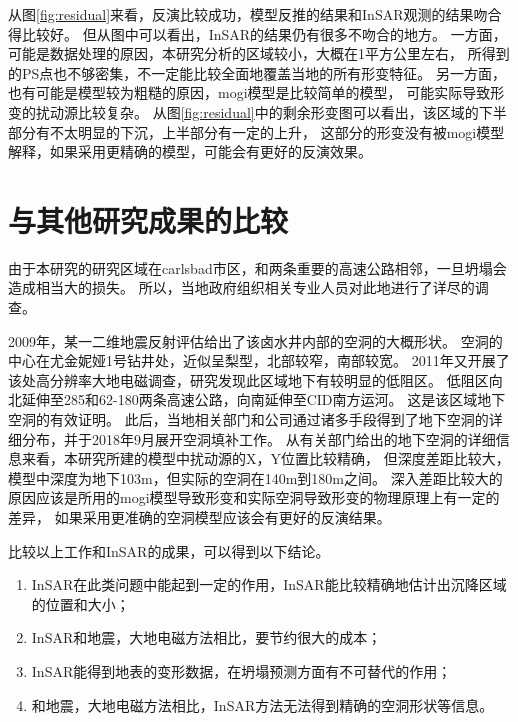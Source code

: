 从图\ref{fig:residual}来看，反演比较成功，模型反推的结果和InSAR观测的结果吻合得比较好。
但从图中可以看出，InSAR的结果仍有很多不吻合的地方。
一方面，可能是数据处理的原因，本研究分析的区域较小，大概在1平方公里左右，
所得到的PS点也不够密集，不一定能比较全面地覆盖当地的所有形变特征。
另一方面，也有可能是模型较为粗糙的原因，mogi模型是比较简单的模型，
可能实际导致形变的扰动源比较复杂。
从图\ref{fig:residual}中的剩余形变图可以看出，该区域的下半部分有不太明显的下沉，上半部分有一定的上升，
这部分的形变没有被mogi模型解释，如果采用更精确的模型，可能会有更好的反演效果。

\section{与其他研究成果的比较}
由于本研究的研究区域在carlsbad市区，和两条重要的高速公路相邻，一旦坍塌会造成相当大的损失。
所以，当地政府组织相关专业人员对此地进行了详尽的调查。

2009年，某一二维地震反射评估给出了该卤水井内部的空洞的大概形状。
空洞的中心在尤金妮娅1号钻井处，近似呈梨型，北部较窄，南部较宽。
2011年又开展了该处高分辨率大地电磁调查\cite{landElectricalResistivitySurvey2011}，研究发现此区域地下有较明显的低阻区。
低阻区向北延伸至285和62-180两条高速公路，向南延伸至CID南方运河。
这是该区域地下空洞的有效证明。
此后，当地相关部门和公司通过诸多手段得到了地下空洞的详细分布，并于2018年9月展开空洞填补工作。
从有关部门给出的地下空洞的详细信息来看，本研究所建的模型中扰动源的X，Y位置比较精确，
但深度差距比较大，模型中深度为地下103m，但实际的空洞在140m到180m之间。
深入差距比较大的原因应该是所用的mogi模型导致形变和实际空洞导致形变的物理原理上有一定的差异，
如果采用更准确的空洞模型应该会有更好的反演结果。

比较以上工作和InSAR的成果，可以得到以下结论。
\begin{enumerate}
    \item InSAR在此类问题中能起到一定的作用，InSAR能比较精确地估计出沉降区域的位置和大小；
    \item InSAR和地震，大地电磁方法相比，要节约很大的成本；
    \item InSAR能得到地表的变形数据，在坍塌预测方面有不可替代的作用；
    \item 和地震，大地电磁方法相比，InSAR方法无法得到精确的空洞形状等信息。
\end{enumerate}
